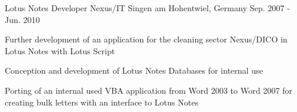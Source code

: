 \begin{cventries}
  \cventry
    {Lotus Notes Developer} %
    {Nexus/IT} %
    {Singen am Hohentwiel, Germany} %
    {Sep. 2007 - Jun. 2010} %
    {
      \begin{cvitems} %
        \item {Further development of an application for the cleaning sector Nexus/DICO in Lotus Notes with Lotus Script}
        \item {Conception and development of Lotus Notes Databases for internal use}
        \item {Porting of an internal used VBA application from Word 2003 to Word 2007 for creating bulk letters with an interface to Lotus Notes}
      \end{cvitems}
    }

\end{cventries}

